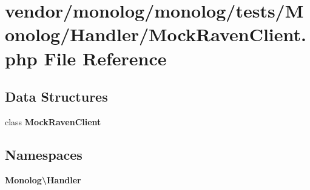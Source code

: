 \section{vendor/monolog/monolog/tests/\+Monolog/\+Handler/\+Mock\+Raven\+Client.php File Reference}
\label{_mock_raven_client_8php}
\subsection*{Data Structures}
\begin{DoxyCompactItemize}
\item 
class {\bf Mock\+Raven\+Client}
\end{DoxyCompactItemize}
\subsection*{Namespaces}
\begin{DoxyCompactItemize}
\item 
 {\bf Monolog\textbackslash{}\+Handler}
\end{DoxyCompactItemize}
